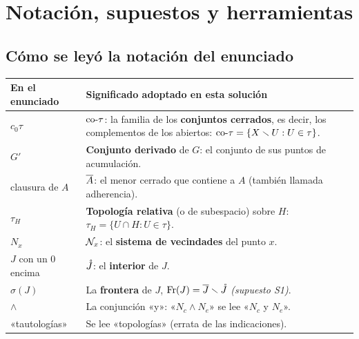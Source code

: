 \section{Notación, supuestos y herramientas}\label{sec:supuestos}

\subsection{Cómo se leyó la notación del enunciado}
\begin{center}\small
\renewcommand{\arraystretch}{1.25}
\begin{tabular}{@{}p{3.2cm}p{12.2cm}@{}}
\toprule
\textbf{En el enunciado} & \textbf{Significado adoptado en esta solución}\\ \midrule
$c_0\tau$ & $\mathrm{co}\text{-}\tau$: la familia de los \textbf{conjuntos cerrados}, es decir, los complementos de los abiertos:
$\mathrm{co}\text{-}\tau=\{X\smallsetminus U: U\in\tau\}$.\\
$G'$ & \textbf{Conjunto derivado} de $G$: el conjunto de sus puntos de acumulación.\\
clausura de $A$ & $\overline{A}$: el menor cerrado que contiene a $A$ (también llamada adherencia).\\
$\tau_H$ & \textbf{Topología relativa} (o de subespacio) sobre $H$: $\tau_H=\{U\cap H: U\in\tau\}$.\\
$N_x$ & $\mathcal{N}_x$: el \textbf{sistema de vecindades} del punto $x$.\\
$J$ con un $0$ encima & $\mathring{J}$: el \textbf{interior} de $J$.\\
$\sigma(J)$ & La \textbf{frontera} de $J$, $\operatorname{Fr}(J)=\overline{J}\smallsetminus\mathring{J}$ \emph{(supuesto S1)}.\\
$\wedge$ & La conjunción «y»: «$N_c\wedge N_e$» se lee «$N_c$ y $N_e$».\\
«tautologías» & Se lee «topologías» (errata de las indicaciones).\\
\bottomrule
\end{tabular}
\end{center}

